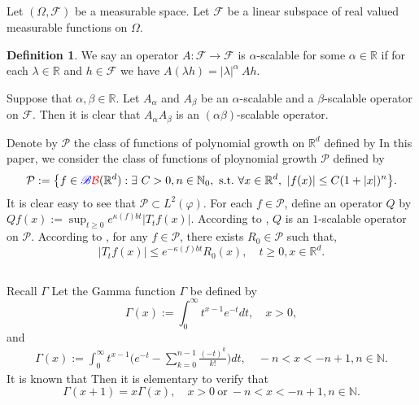 \documentclass[12pt,oneside,english]{amsart}
\theoremstyle{plain}
\theoremstyle{definition}
\newtheorem{defi}[thm]{Definition}
\numberwithin{equation}{section}
\newcommand{\added}[1]{{\color{blue}#1}}\newcommand{\deleted}[1]{{\color{red}#1}}
\begin{document}
\added{
\subsection{} 
    Let $(\Omega, \mathscr F)$ be a measurable space.
    Let $\mathcal F$ be a linear subspace of real valued measurable functions on $\Omega$.
\begin{defi}
\label{def: alpha-positive operator}
    We say an operator $A: \mathcal F \to \mathcal F$ is $\alpha$-scalable for some $\alpha \in \mathbb R$ if for each $\lambda \in \mathbb R$ and $h \in \mathcal F$ we have $A (\lambda h) = |\lambda|^\alpha~ Ah$.
\end{defi}

    Suppose that $\alpha, \beta \in \mathbb R$. 
    Let $A_\alpha$ and $A_\beta$ be an $\alpha$-scalable and a $\beta$-scalable operator on $\mathcal F$. 
    Then it is clear that $A_\alpha A_\beta$ is an $(\alpha\beta)$-scalable operator.
}
\added{
    Denote by $\mathcal P$ the class of functions of polynomial growth on $\mathbb R^d$ defined by
}
\deleted{
    In this paper, we consider the class of functions of ploynomial growth $\mathcal{P}$ defined by
}
\begin{equation}
    \mathcal{P}
    :=\big \{f\in \added{ \mathscr B}\deleted{ \mathcal{B}}(\mathbb{R}^d):\exists~ C>0, n \in \mathbb N_0, {\rm ~s.t.~} \forall x\in \mathbb{R}^d,~ |f(x)|\leq C(1+|x|)^n\big\}.
\end{equation}
    It is \added{clear} \deleted{easy to see} that $\mathcal{P} \subset L^2(\varphi)$.
    \added{ For each $f\in \mathcal {P}$, define an operator $Q$ by $Qf(x):=\sup_{t\geq 0}e^{\kappa(f)bt} |T_tf(x)|$.}
\added{
    According to \cite[Fact 1.2]{MM}, $Q$ is an $1$-scalable operator on $\mathcal P$.
}
\deleted{
    According to \cite[Fact 1.2]{MM}, for any $f \in \mathcal{P}$, there exists $R_0 \in \mathcal{P}$ such that,
\begin{equation}
\label{eq:semigroupineq}
    |T_tf(x)|
    \leq e^{-\kappa(f)bt} R_0(x),
    \quad t\geq 0, x\in \mathbb R^d.
\end{equation}
}

\subsection{}
    \added{Recall $\Gamma$} \deleted{Let} the Gamma function \deleted{$\Gamma$ be} defined by
\begin{equation}
    \Gamma (x) := \int_0^\infty t^{x-1} e^{-t}dt,
    \quad x>0,
\end{equation}
and
\begin{align}
\label{eq: definition of Gamma function}
    \Gamma(x)
    := \int_0^\infty t^{x-1} \Big(e^{-t} - \sum_{k=0}^{n-1} \frac{(-t)^k}{k!}\Big) dt,
    \quad -n< x< -n+1, n\in \mathbb N.
\end{align}
    \added{ It is known that }\deleted{ Then it is elementary to verify that}
\begin{equation}
    \Gamma(x+1) = x\Gamma(x),
    \quad x>0~\text{or}~-n< x< -n+1, n\in \mathbb N.
\end{equation}
\end{document}
